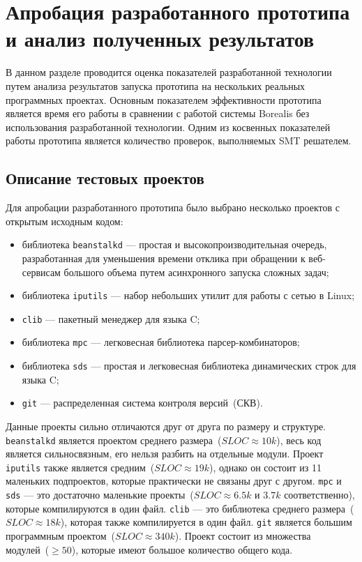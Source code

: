 \chapter{Апробация разработанного прототипа и анализ полученных результатов}
\label{chapter:testing}
В данном разделе проводится оценка показателей разработанной технологии путем 
анализа результатов запуска прототипа на нескольких реальных программных 
проектах. Основным показателем эффективности прототипа является время его работы
в сравнении с работой системы Borealis без использования разработанной технологии.
Одним из косвенных показателей работы прототипа является количество проверок,
выполняемых SMT решателем.

\section{Описание тестовых проектов}
Для апробации разработанного прототипа было выбрано несколько проектов с открытым
исходным кодом:
\begin{itemize}
\item библиотека \texttt{beanstalkd} --- простая и высокопроизводительная 
очередь, разработанная для уменьшения времени отклика при обращении к веб-
сервисам большого объема путем асинхронного запуска сложных задач;
\item библиотека \texttt{iputils} --- набор небольших утилит для работы с
сетью в Linux;
\item \texttt{clib} --- пакетный менеджер для языка C;
\item библиотека \texttt{mpc} --- легковесная библиотека парсер-комбинаторов;
\item библиотека \texttt{sds} --- простая и легковесная библиотека динамических
строк для языка C;
\item \texttt{git} — распределенная система контроля версий~(СКВ).
\end{itemize}

Данные проекты сильно отличаются друг от друга по размеру и структуре. 
\texttt{beanstalkd} является проектом среднего размера~($SLOC \approx 10k$), 
весь код является сильносвязным, его нельзя разбить на отдельные модули. Проект 
\texttt{iputils} также является средним~($SLOC \approx 19k$), однако он состоит 
из 11 маленьких подпроектов, которые практически не связаны друг с другом. 
\texttt{mpc} и \texttt{sds} --- это достаточно маленькие проекты~($SLOC \approx 
6.5k$ и $3.7k$ соответственно), которые компилируются в один файл. \texttt{clib}
--- это библиотека среднего размера~($SLOC \approx 18k$), которая также 
компилируется в один файл. \texttt{git} является большим программным
проектом~($SLOC \approx 340k$). Проект состоит из множества модулей~($\ge 50$), 
которые имеют большое количество общего кода.

